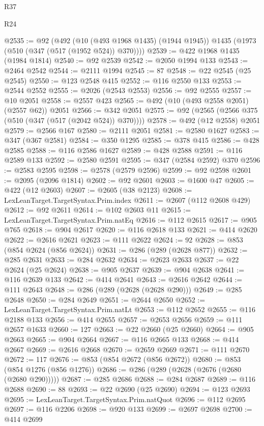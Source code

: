 \begin{lexlean}{R37}
\begin{lexlean}{R24}
\begin{coremodule}
{{{{{{{{{{{{{{{{{{{{{{{{{{{{{{{{{{{{{{{{{{{{{{{{{{{{{{{{{{{{{{{{{{{{{{{{{{{{{{{{{{{{{{{{{{{{{{{{{{{{{{{{{{{{{{{{{{{{{{{{{{{{{{{{{{{{{{{{{{{{{{{{{{{{{{{{{{{{{{{{{{{{{{{{{{{{{{{{{{{{{{{{{@2535 := @92
    (@492
      (@10 (@493 @1968 @1435) (@1944 @1945))
      @1435
      (@1973 (@510 (@347 (@517 (@1952 @524)) @370))))
@2539 := @422 @1968 @1435 (@1984 @1814)
@2540 := @92 @2539
@2542 := @2050 @1994 @133
@2543 := @2464 @2542
@2544 := @2111 @1994
@2545 := 87
@2548 := @22 @2545 (@25 @2545)
@2550 := @123 @2548 @415
@2552 := @116 @2550 @133
@2553 := @2544 @2552
@2555 := @2026 (@2543 @2553)
@2556 := @92 @2555
@2557 := @10 @2051
@2558 := @2557 @423
@2565 := @492 (@10 (@493 @2558 @2051) (@2557 @62)) @2051
@2566 := @342 @2051
@2575 := @92 (@2565 (@2566 @375 (@510 (@347 (@517 (@2042 @524)) @370))))
@2578 := @492 (@12 @2558) @2051
@2579 := @2566 @167
@2580 := @2111 @2051
@2581 := @2580 @1627
@2583 := @347 (@367 @2581)
@2584 := @350 @1295
@2585 := @378 @415
@2586 := @428 @2585
@2588 := @116 @2586 @1627
@2589 := @428 @2588
@2591 := @116 @2589 @133
@2592 := @2580 @2591
@2595 := @347 (@2584 @2592) @370
@2596 := @2583 @2595
@2598 := @2578 (@2579 @2596)
@2599 := @92 @2598
@2601 := @2095 (@2096 @1814)
@2602 := @92 @2601
@2603 := @1600 @47
@2605 := @422 (@12 @2603)
@2607 := @2605 (@38 @2123)
@2608 := LexLeanTarget.TargetSyntax.Prim.index
@2611 := @2607 (@112 @2608 @429)
@2612 := @92 @2611
@2614 := @102 @2603 @11
@2615 := LexLeanTarget.TargetSyntax.Prim.natEq
@2616 := @112 @2615
@2617 := @905 @765
@2618 := @904 @2617
@2620 := @116 @2618 @133
@2621 := @414 @2620
@2622 := @2616 @2621
@2623 := @111 @2622
@2624 := 92
@2628 := @853 (@854 @2624 (@856 @2624))
@2631 := @286 (@289 (@2628 @877))
@2632 := @285 @2631
@2633 := @284 @2632
@2634 := @2623 @2633
@2637 := @22 @2624 (@25 @2624)
@2638 := @905 @2637
@2639 := @904 @2638
@2641 := @116 @2639 @133
@2642 := @414 @2641
@2643 := @2616 @2642
@2644 := @111 @2643
@2648 := @286 (@289 (@2628 (@2628 @290)))
@2649 := @285 @2648
@2650 := @284 @2649
@2651 := @2644 @2650
@2652 := LexLeanTarget.TargetSyntax.Prim.natLt
@2653 := @112 @2652
@2655 := @116 @2188 @133
@2656 := @414 @2655
@2657 := @2653 @2656
@2659 := @111 @2657 @1633
@2660 := 127
@2663 := @22 @2660 (@25 @2660)
@2664 := @905 @2663
@2665 := @904 @2664
@2667 := @116 @2665 @133
@2668 := @414 @2667
@2669 := @2616 @2668
@2670 := @2659 @2669
@2671 := @111 @2670
@2672 := 117
@2676 := @853 (@854 @2672 (@856 @2672))
@2680 := @853 (@854 @1276 (@856 @1276))
@2686 := @286 (@289 (@2628 (@2676 (@2680 (@2680 @290)))))
@2687 := @285 @2686
@2688 := @284 @2687
@2689 := @116 @2688
@2690 := 88
@2693 := @22 @2690 (@25 @2690)
@2694 := @123 @2693
@2695 := LexLeanTarget.TargetSyntax.Prim.natQuot
@2696 := @112 @2695
@2697 := @116 @2206
@2698 := @920 @133
@2699 := @2697 @2698
@2700 := @414 @2699
}}}}}}}}}}}}}}}}}}}}}}}}}}}}}}}}}}}}}}}}}}}}}}}}}}}}}}}}}}}}}}}}}}}}}}}}}}}}}}}}}}}}}}}}}}}}}}}}}}}}}}}}}}}}}}}}}}}}}}}}}}}}}}}}}}}}}}}}}}}}}}}}}}}}}}}}}}}}}}}}}}}}}}}}}}}}}}}}}}}}}}}}}
\end{coremodule}
\end{lexlean}
\end{lexlean}
